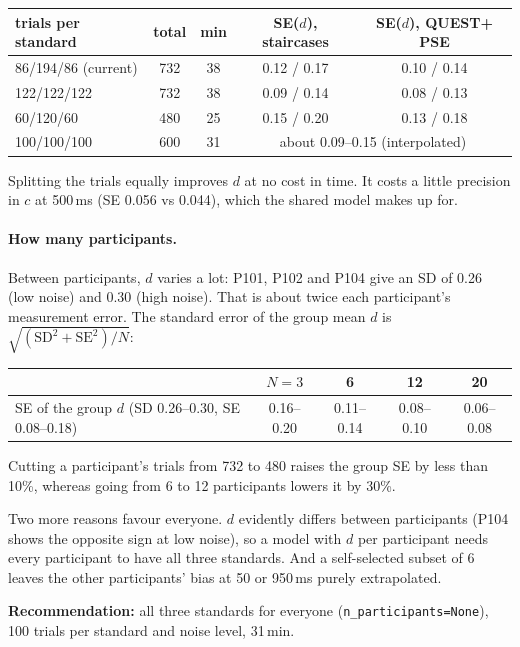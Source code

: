 \documentclass[11pt,a4paper]{article}
\begin{document}
\begin{center}\small
\begin{tabular}{lcccc}
\toprule
trials per standard & total & min & SE($d$), staircases & SE($d$), QUEST+ PSE \\
\midrule
86/194/86 (current) & 732 & 38 & 0.12 / 0.17 & 0.10 / 0.14 \\
122/122/122 & 732 & 38 & 0.09 / 0.14 & 0.08 / 0.13 \\
60/120/60 & 480 & 25 & 0.15 / 0.20 & 0.13 / 0.18 \\
100/100/100 & 600 & 31 & \multicolumn{2}{c}{about 0.09--0.15 (interpolated)} \\
\bottomrule
\end{tabular}
\end{center}

Splitting the trials equally improves $d$ at no cost in time. It costs a little precision in $c$ at 500\,ms (SE 0.056 vs 0.044), which the shared model makes up for.

\paragraph{How many participants.} Between participants, $d$ varies a lot: P101, P102 and P104 give an SD of 0.26 (low noise) and 0.30 (high noise). That is about twice each participant's measurement error. The standard error of the group mean $d$ is $\sqrt{(\text{SD}^2 + \text{SE}^2)/N}$:
\begin{center}\small
\begin{tabular}{lcccc}
\toprule
& $N = 3$ & 6 & 12 & 20 \\
\midrule
SE of the group $d$ (SD 0.26--0.30, SE 0.08--0.18) & 0.16--0.20 & 0.11--0.14 & 0.08--0.10 & 0.06--0.08 \\
\bottomrule
\end{tabular}
\end{center}
Cutting a participant's trials from 732 to 480 raises the group SE by less than 10\%, whereas going from 6 to 12 participants lowers it by 30\%.

Two more reasons favour everyone. $d$ evidently differs between participants (P104 shows the opposite sign at low noise), so a model with $d$ per participant needs every participant to have all three standards. And a self-selected subset of 6 leaves the other participants' bias at 50 or 950\,ms purely extrapolated.

\textbf{Recommendation:} all three standards for everyone (\texttt{n\_participants=None}), 100 trials per standard and noise level, 31\,min.
\end{document}
